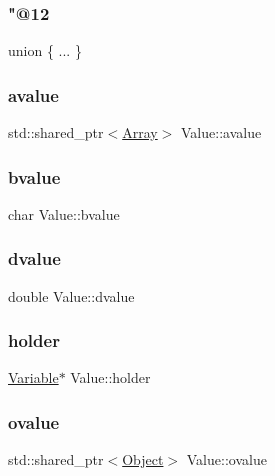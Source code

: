 \subsubsection{\texorpdfstring{"@12}{@12}}
{\footnotesize\ttfamily union \{ ... \} }

\mbox{\label{classValue_acb0c09facf0b3b0a88f6fb5a240c1783}} 
\subsubsection{\texorpdfstring{avalue}{avalue}}
{\footnotesize\ttfamily std\+::shared\+\_\+ptr$<$\hyperlink{classArray}{Array}$>$ Value\+::avalue}

\mbox{\label{classValue_a6690838c4e198bd9b371108cffcd09e3}} 
\subsubsection{\texorpdfstring{bvalue}{bvalue}}
{\footnotesize\ttfamily char Value\+::bvalue}

\mbox{\label{classValue_aac350b98b4eb19c6a9b79dae50e97cc6}} 
\subsubsection{\texorpdfstring{dvalue}{dvalue}}
{\footnotesize\ttfamily double Value\+::dvalue}

\mbox{\label{classValue_af3b547ae64c4985008d6eb7c39868a3f}} 
\subsubsection{\texorpdfstring{holder}{holder}}
{\footnotesize\ttfamily \hyperlink{classVariable}{Variable}$\ast$ Value\+::holder}

\mbox{\label{classValue_a04703ea830e0cb9a24286c588e69ee28}} 
\subsubsection{\texorpdfstring{ovalue}{ovalue}}
{\footnotesize\ttfamily std\+::shared\+\_\+ptr$<$\hyperlink{classObject}{Object}$>$ Value\+::ovalue}

